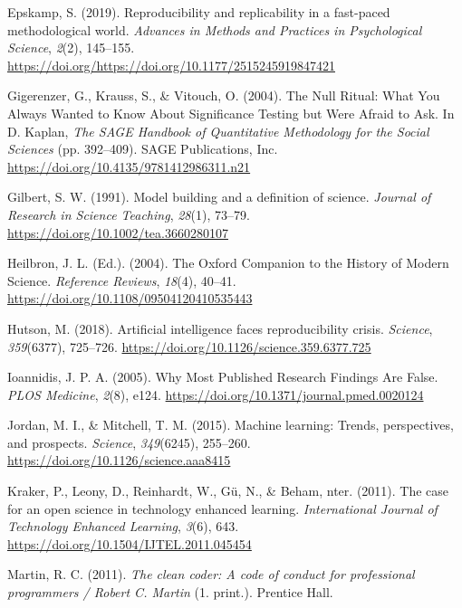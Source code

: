 \documentclass[12pt,a4paper,]{article}
\begin{document}
\leavevmode\hypertarget{ref-epskamp2019rep}{}%
Epskamp, S. (2019). Reproducibility and replicability in a fast-paced methodological world. \emph{Advances in Methods and Practices in Psychological Science}, \emph{2}(2), 145--155. \url{https://doi.org/https://doi.org/10.1177/2515245919847421}

\leavevmode\hypertarget{ref-gigerenzerNullRitualWhat2004}{}%
Gigerenzer, G., Krauss, S., \& Vitouch, O. (2004). The Null Ritual: What You Always Wanted to Know About Significance Testing but Were Afraid to Ask. In D. Kaplan, \emph{The SAGE Handbook of Quantitative Methodology for the Social Sciences} (pp. 392--409). SAGE Publications, Inc. \url{https://doi.org/10.4135/9781412986311.n21}

\leavevmode\hypertarget{ref-gilbertModelBuildingDefinition1991}{}%
Gilbert, S. W. (1991). Model building and a definition of science. \emph{Journal of Research in Science Teaching}, \emph{28}(1), 73--79. \url{https://doi.org/10.1002/tea.3660280107}

\leavevmode\hypertarget{ref-heilbronOxfordCompanionHistory2004}{}%
Heilbron, J. L. (Ed.). (2004). The Oxford Companion to the History of Modern Science. \emph{Reference Reviews}, \emph{18}(4), 40--41. \url{https://doi.org/10.1108/09504120410535443}

\leavevmode\hypertarget{ref-hutsonArtificialIntelligenceFaces2018}{}%
Hutson, M. (2018). Artificial intelligence faces reproducibility crisis. \emph{Science}, \emph{359}(6377), 725--726. \url{https://doi.org/10.1126/science.359.6377.725}

\leavevmode\hypertarget{ref-ioannidisWhyMostPublished2005}{}%
Ioannidis, J. P. A. (2005). Why Most Published Research Findings Are False. \emph{PLOS Medicine}, \emph{2}(8), e124. \url{https://doi.org/10.1371/journal.pmed.0020124}

\leavevmode\hypertarget{ref-jordanMachineLearningTrends2015}{}%
Jordan, M. I., \& Mitchell, T. M. (2015). Machine learning: Trends, perspectives, and prospects. \emph{Science}, \emph{349}(6245), 255--260. \url{https://doi.org/10.1126/science.aaa8415}

\leavevmode\hypertarget{ref-krakerCaseOpenScience2011}{}%
Kraker, P., Leony, D., Reinhardt, W., Gü, N., \& Beham, nter. (2011). The case for an open science in technology enhanced learning. \emph{International Journal of Technology Enhanced Learning}, \emph{3}(6), 643. \url{https://doi.org/10.1504/IJTEL.2011.045454}

\leavevmode\hypertarget{ref-martinCleanCoderCode2011}{}%
Martin, R. C. (2011). \emph{The clean coder: A code of conduct for professional programmers / Robert C. Martin} (1. print.). Prentice Hall.
\end{document}

